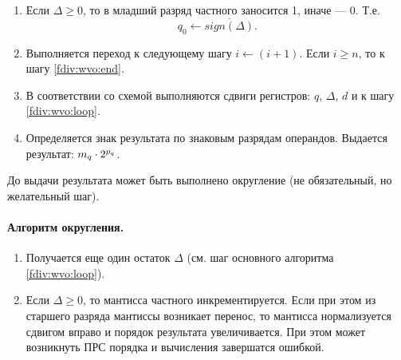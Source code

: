 \begin{enumerate}
    \item Если $\Delta \ge 0$, то в младший разряд частного заносится 1, иначе --- 0. Т.е. \[q_0\gets \overline{sign(\Delta)}.\]
    
    \item Выполняется переход к следующему шагу $i\gets (i + 1)$. Если $i\geq n$, то к шагу \ref{fdiv:wvo:end}.
    
    \item В соответствии со схемой выполняются сдвиги регистров: $q$, $\Delta$, $d$ и к шагу \ref{fdiv:wvo:loop}.
    
    \item\label{fdiv:wvo:end} Определяется знак результата по знаковым разрядам операндов. Выдается результат: $m_{q}\cdot {2}^{p_{q}}$. 
\end{enumerate}

До выдачи результата может быть выполнено округление (не обязательный, но желательный шаг).
\paragraph{Алгоритм округления.}
\begin{enumerate}
    \item Получается еще один остаток $\Delta$ (см. шаг основного алгоритма \ref{fdiv:wvo:loop}).
    
    \item Если $\Delta\ge 0$, то мантисса частного инкрементируется. Если при этом из старшего разряда мантиссы возникает перенос, то мантисса нормализуется сдвигом вправо и порядок результата увеличивается. При этом  может возникнуть ПРС порядка и вычисления завершатся ошибкой.
\end{enumerate}

